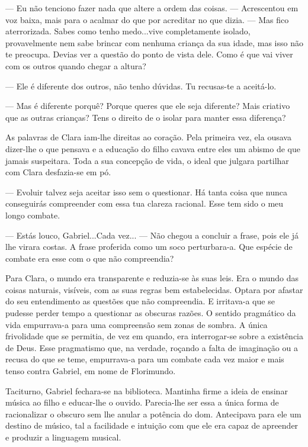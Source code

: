 --- Eu não tenciono fazer nada que altere a ordem das coisas. ---
Acrescentou em voz baixa, mais para o acalmar do que por acreditar no
que dizia. --- Mas fico aterrorizada. Sabes como tenho medo...vive
completamente isolado, provavelmente nem sabe brincar com nenhuma
criança da sua idade, mas isso não te preocupa. Devias ver a questão do
ponto de vista dele. Como é que vai viver com os outros quando chegar a
altura?

--- Ele é diferente dos outros, não tenho dúvidas. Tu recusas-te a
aceitá-lo.

--- Mas é diferente porquê? Porque queres que ele seja diferente? Mais
criativo que as outras crianças? Tens o direito de o isolar para manter
essa diferença?

As palavras de Clara iam-lhe direitas ao coração. Pela primeira vez, ela
ousava dizer-lhe o que pensava e a educação do filho cavava entre eles
um abismo de que jamais suspeitara. Toda a sua concepção de vida, o
ideal que julgara partilhar com Clara desfazia-se em pó.

--- Evoluir talvez seja aceitar isso sem o questionar. Há tanta coisa que
nunca conseguirás compreender com essa tua clareza racional. Esse tem
sido o meu longo combate.

--- Estás louco, Gabriel...Cada vez... --- Não chegou a concluir a frase,
pois ele já lhe virara costas. A frase proferida como um soco
perturbara-a. Que espécie de combate era esse com o que não compreendia?

Para Clara, o mundo era transparente e reduzia-se às suas leis. Era o
mundo das coisas naturais, visíveis, com as suas regras bem
estabelecidas. Optara por afastar do seu entendimento as questões que
não compreendia. E irritava-a que se pudesse perder tempo a questionar
as obscuras razões. O sentido pragmático da vida empurrava-a para uma
compreensão sem zonas de sombra. A única frivolidade que se permitia, de
vez em quando, era interrogar-se sobre a existência de Deus. Esse
pragmatismo que, na verdade, roçando a falta de imaginação ou a recusa
do que se teme, empurrava-a para um combate cada vez maior e mais tenso
contra Gabriel, em nome de Florimundo.

Taciturno, Gabriel fechara-se na biblioteca. Mantinha firme a ideia de
ensinar música ao filho e educar-lhe o ouvido. Parecia-lhe ser essa a
única forma de racionalizar o obscuro sem lhe anular a potência do dom.
Antecipava para ele um destino de músico, tal a facilidade e intuição
com que ele era capaz de apreender e produzir a linguagem musical.

